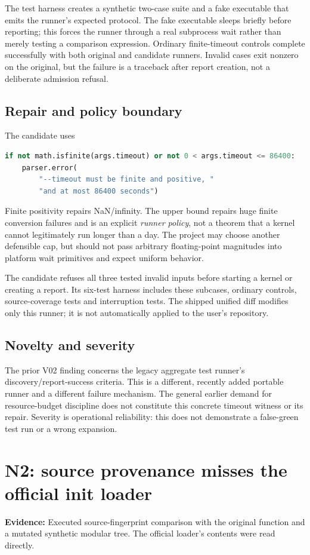 \documentclass[11pt,letterpaper]{article}
\newcommand{\evidence}[1]{\textbf{Evidence:} #1}
\begin{document}
The test harness creates a synthetic two-case suite and a fake executable that emits the runner's expected protocol. The fake executable sleeps briefly before reporting; this forces the runner through a real subprocess wait rather than merely testing a comparison expression. Ordinary finite-timeout controls complete successfully with both original and candidate runners. Invalid cases exit nonzero on the original, but the failure is a traceback after report creation, not a deliberate admission refusal.

\subsection{Repair and policy boundary}
The candidate uses
\begin{lstlisting}[language=Python]
if not math.isfinite(args.timeout) or not 0 < args.timeout <= 86400:
    parser.error(
        "--timeout must be finite and positive, "
        "and at most 86400 seconds")
\end{lstlisting}
Finite positivity repairs NaN/infinity. The upper bound repairs huge finite conversion failures and is an explicit \emph{runner policy}, not a theorem that a kernel cannot legitimately run longer than a day. The project may choose another defensible cap, but should not pass arbitrary floating-point magnitudes into platform wait primitives and expect uniform behavior.

The candidate refuses all three tested invalid inputs before starting a kernel or creating a report. Its six-test harness includes these subcases, ordinary controls, source-coverage tests and interruption tests. The shipped unified diff modifies only this runner; it is not automatically applied to the user's repository.

\subsection{Novelty and severity}
The prior V02 finding concerns the legacy aggregate test runner's discovery/report-success criteria. This is a different, recently added portable runner and a different failure mechanism. The general earlier demand for resource-budget discipline does not constitute this concrete timeout witness or its repair. Severity is operational reliability: this does not demonstrate a false-green test run or a wrong expansion.

\section{N2: source provenance misses the official init loader}
\evidence{Executed source-fingerprint comparison with the original function and a mutated synthetic modular tree. The official loader's contents were read directly.}
\end{document}
